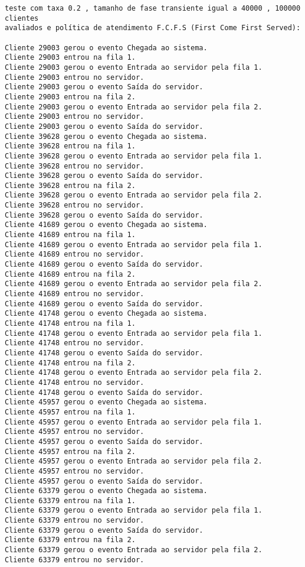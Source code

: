 \begin{verbatim}
teste com taxa 0.2 , tamanho de fase transiente igual a 40000 , 100000 clientes 
avaliados e política de atendimento F.C.F.S (First Come First Served):

Cliente 29003 gerou o evento Chegada ao sistema.
Cliente 29003 entrou na fila 1.
Cliente 29003 gerou o evento Entrada ao servidor pela fila 1.
Cliente 29003 entrou no servidor.
Cliente 29003 gerou o evento Saída do servidor.
Cliente 29003 entrou na fila 2.
Cliente 29003 gerou o evento Entrada ao servidor pela fila 2.
Cliente 29003 entrou no servidor.
Cliente 29003 gerou o evento Saída do servidor.
Cliente 39628 gerou o evento Chegada ao sistema.
Cliente 39628 entrou na fila 1.
Cliente 39628 gerou o evento Entrada ao servidor pela fila 1.
Cliente 39628 entrou no servidor.
Cliente 39628 gerou o evento Saída do servidor.
Cliente 39628 entrou na fila 2.
Cliente 39628 gerou o evento Entrada ao servidor pela fila 2.
Cliente 39628 entrou no servidor.
Cliente 39628 gerou o evento Saída do servidor.
Cliente 41689 gerou o evento Chegada ao sistema.
Cliente 41689 entrou na fila 1.
Cliente 41689 gerou o evento Entrada ao servidor pela fila 1.
Cliente 41689 entrou no servidor.
Cliente 41689 gerou o evento Saída do servidor.
Cliente 41689 entrou na fila 2.
Cliente 41689 gerou o evento Entrada ao servidor pela fila 2.
Cliente 41689 entrou no servidor.
Cliente 41689 gerou o evento Saída do servidor.
Cliente 41748 gerou o evento Chegada ao sistema.
Cliente 41748 entrou na fila 1.
Cliente 41748 gerou o evento Entrada ao servidor pela fila 1.
Cliente 41748 entrou no servidor.
Cliente 41748 gerou o evento Saída do servidor.
Cliente 41748 entrou na fila 2.
Cliente 41748 gerou o evento Entrada ao servidor pela fila 2.
Cliente 41748 entrou no servidor.
Cliente 41748 gerou o evento Saída do servidor.
Cliente 45957 gerou o evento Chegada ao sistema.
Cliente 45957 entrou na fila 1.
Cliente 45957 gerou o evento Entrada ao servidor pela fila 1.
Cliente 45957 entrou no servidor.
Cliente 45957 gerou o evento Saída do servidor.
Cliente 45957 entrou na fila 2.
Cliente 45957 gerou o evento Entrada ao servidor pela fila 2.
Cliente 45957 entrou no servidor.
Cliente 45957 gerou o evento Saída do servidor.
Cliente 63379 gerou o evento Chegada ao sistema.
Cliente 63379 entrou na fila 1.
Cliente 63379 gerou o evento Entrada ao servidor pela fila 1.
Cliente 63379 entrou no servidor.
Cliente 63379 gerou o evento Saída do servidor.
Cliente 63379 entrou na fila 2.
Cliente 63379 gerou o evento Entrada ao servidor pela fila 2.
Cliente 63379 entrou no servidor.

\end{verbatim}

